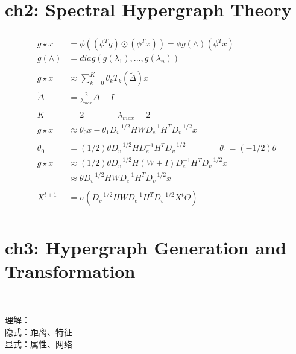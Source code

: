 \documentclass{article}
\begin{document}
\newpage
\section*{ch2: Spectral Hypergraph Theory}


\begin{align*}
    ~ \\[3pt]
    g \star x &= \phi ( (\phi^{T} g) \odot (\phi^{T} x) ) 
              = \phi g(\wedge) (\phi^{T} x)  \\[3pt]
    g(\wedge) &= diag( g(\lambda_{1}), ..., g(\lambda_{n}) )  \\[3pt]
    ~ \\[3pt]
    g \star x & \approx \sum_{k=0}^{K} \theta_{k} T_{k} ( \tilde{\Delta} ) x  \\[3pt]
    \tilde{\Delta} & = \frac{2}{\lambda_{max}} \Delta - I  \\[3pt]
    ~ \\[3pt]
    K & = 2  \qquad \qquad \lambda_{max} = 2  \\[3pt]
    g \star x & \approx \theta_{0}x - \theta_{1} 
        D_{v}^{-1/2} H W D_{e}^{-1} H^{T} D_{v}^{-1/2} x  \\[3pt]
    ~ \\[3pt]
    \theta_{0} &= (1/2) \theta D_{v}^{-1/2} H D_{e}^{-1} H^{T} D_{v}^{-1/2} \qquad \qquad 
    \theta_{1} = (-1/2) \theta  \\[3pt]
    g \star x & \approx (1/2) \theta D_{v}^{-1/2} H (W+I) D_{e}^{-1} H^{T} D_{v}^{-1/2} x  \\[3pt]
              & \approx \theta D_{v}^{-1/2} H W D_{e}^{-1} H^{T} D_{v}^{-1/2} x  \\[3pt]
    ~ \\[3pt]
    X^{t+1} &= \sigma ( D_{v}^{-1/2} H W D_{e}^{-1} H^{T} D_{v}^{-1/2} X^{t} \varTheta )  \\[3pt]
\end{align*}

\newpage
\section*{ch3: Hypergraph Generation and Transformation}


~ \\[3pt]
\begin{CJK}{UTF8}{gbsn}
    理解： \\[3pt]
        隐式：距离、特征  \\[3pt]
        显式：属性、网络  \\[3pt]
\end{CJK}
\end{document}
